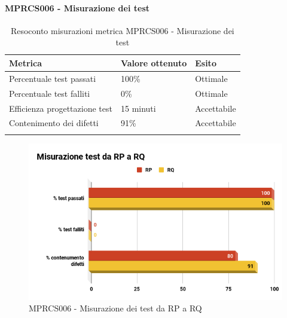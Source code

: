 \paragraph{MPRCS006 - Misurazione dei test}
\begin{center}
	\centering
	\renewcommand{\arraystretch}{1.5}
	\begin{longtable}{  p{5cm}  p{5cm} p{3cm}  }
		\rowcolor{tableHeadYellow}
		\textbf{Metrica}   & \textbf{Valore ottenuto} & \textbf{Esito} \\ 
		\endhead
		Percentuale test passati     & 100\%  & Ottimale \\
		Percentuale test falliti     & 0\% & Ottimale \\
		Efficienza progettazione test    & 15 minuti & Accettabile \\
		Contenimento dei difetti    & 91\% & Accettabile \\
		\rowcolor{white}
		\caption{Resoconto misurazioni metrica MPRCS006 - Misurazione dei test}
	\end{longtable}
\end{center}
\begin{figure}[H]
	\centering
	\includegraphics[width=13cm,keepaspectratio]{../includes/pics/Misurazione.png}
	\caption{\label{fig:mission}MPRCS006 - Misurazione dei test da RP a RQ}
\end{figure}
